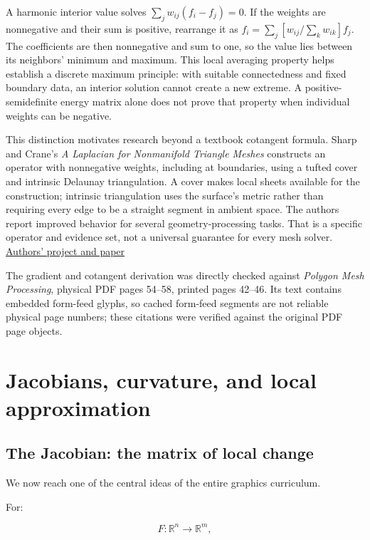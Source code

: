A harmonic interior value solves \(\sum_jw_{ij}(f_i-f_j)=0\). If the weights are nonnegative and their sum is positive, rearrange it as \(f_i=\sum_j[w_{ij}/\sum_kw_{ik}]f_j\). The coefficients are then nonnegative and sum to one, so the value lies between its neighbors' minimum and maximum. This local averaging property helps establish a discrete maximum principle: with suitable connectedness and fixed boundary data, an interior solution cannot create a new extreme. A positive-semidefinite energy matrix alone does not prove that property when individual weights can be negative.

This distinction motivates research beyond a textbook cotangent formula. Sharp and Crane's \emph{A Laplacian for Nonmanifold Triangle Meshes} constructs an operator with nonnegative weights, including at boundaries, using a tufted cover and intrinsic Delaunay triangulation. A cover makes local sheets available for the construction; intrinsic triangulation uses the surface's metric rather than requiring every edge to be a straight segment in ambient space. The authors report improved behavior for several geometry-processing tasks. That is a specific operator and evidence set, not a universal guarantee for every mesh solver. \href{https://www.cs.cmu.edu/~kmcrane/Projects/NonmanifoldLaplace/index.html}{Authors' project and paper}

The gradient and cotangent derivation was directly checked against \emph{Polygon Mesh Processing}, physical PDF pages 54--58, printed pages 42--46. Its text contains embedded form-feed glyphs, so cached form-feed segments are not reliable physical page numbers; these citations were verified against the original PDF page objects.

\section{Jacobians, curvature, and local approximation}\label{02-foundations-ii-ch021-jacobians-curvature-and-local-approximation}

\subsection{The Jacobian: the matrix of local change}\label{02-foundations-ii-ch021-the-jacobian-the-matrix-of-local-change}

We now reach one of the central ideas of the entire graphics curriculum.

For:

\[
F:\mathbb R^n\rightarrow\mathbb R^m,
\]

